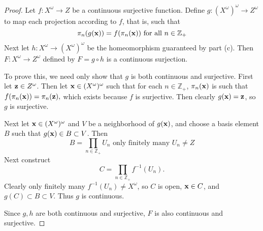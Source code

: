 \documentclass[11pt]{article}
\begin{document}
\begin{proof}
  Let $f: X^\omega \to Z$ be a continuous surjective function. Define $g:
  (X^\omega)^\omega \to Z^\omega$ to map each projection according to $f$, that
  is, such that
  \[ \pi_n(g(\vb x)) = f (\pi_n(\vb x)) \text{ for all } n \in \mathbb{Z}_+ \]
  Next let $h: X^\omega \to (X^\omega)^\omega$ be the homeomorphism guaranteed
  by part (c). Then $F: X^\omega \to Z^\omega$ defined by $F = g \circ h$ is a
  continuous surjection.

  To prove this, we need only show that $g$ is both continuous and surjective.
  First let $\vb z \in Z^\omega$. Then let $\vb x \in (X^\omega)^\omega$ such
  that for each $n \in \mathbb{Z}_+$, $\pi_n(\vb x)$ is such that $f(\pi_n(\vb
  x)) = \pi_n(\vb z),$ which exists because $f$ is surjective. Then clearly
  $g(\vb x) = \vb z$, so $g$ is surjective.

  Next let $\vb x \in (X^\omega)^\omega$ and $V$ be a neighborhood of $g(\vb
  x)$, and choose a basis element $B$ such that $g(\vb x) \in B \subset V$. Then
  \[ B = \prod_{n \in \mathbb{Z}_+} U_n \text{ only finitely many $U_n \neq Z$}\]
  Next construct
  \[ C = \prod_{n \in \mathbb{Z}_+} f^{-1}(U_n). \]
  Clearly only finitely many $f^{-1}(U_n) \neq X^\omega$,
  so $C$ is open, $\vb x \in C$, and $g(C) \subset B \subset V$. Thus $g$ is
  continuous.

  Since $g, h$ are both continuous and surjective, $F$ is also continuous and
  surjective.

\end{proof}
\end{document}
